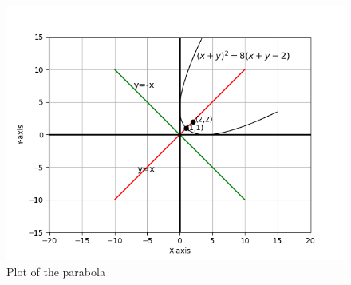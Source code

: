 \documentclass[journal]{IEEEtran}
\begin{document}
\begin{figure}[h!]
   \centering
   \includegraphics[width=0.7\linewidth]{figs/plot.png}
   \caption{Plot of the parabola}
   \label{}
\end{figure}
\end{document}
